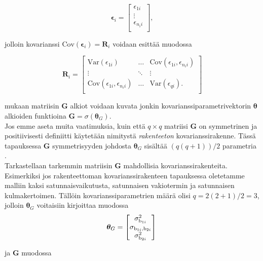 \documentclass[finnish]{docopts}
\begin{document}
$$
\bm{\epsilon}_i =
\begin{bmatrix}
\epsilon_{1i} \\
\vdots \\
\epsilon_{n_{i}i} \\
\end{bmatrix},
$$

jolloin kovarianssi  $\text{Cov}(\bm{\epsilon}_i) = \bm{R}_i$ voidaan esittää muodossa

$$
\bm{R}_i =
\begin{bmatrix}
\text{Var}(\epsilon_{1i}) & \dots & \text{Cov}(\epsilon_{1i}, \epsilon_{n_{i}i}) \\
\vdots & \ddots & \vdots \\
\text{Cov}(\epsilon_{1i}, \epsilon_{n_{i}i}) & \dots & \text{Var}(\epsilon_{qi}). \\
\end{bmatrix}
$$

\cite{burzykowski13, west14} mukaan matriisin $\bm{G}$ alkiot voidaan kuvata jonkin kovarianssiparametrivektorin $\bm{\theta}$ alkioiden funktioina $\bm{G} = \sigma(\bm{\theta}_G)$.\\

Jos emme aseta muita vaatimuksia, kuin että $q \times q$ matriisi $\bm{G}$ on symmetrinen ja positiivisesti definiitti käytetään nimitystä \textit{rakenteeton} kovarianssirakenne. Tässä tapauksessa $\bm{G}$ symmetrisyyden johdosta $\bm{\theta}_G$ sisältää $(q(q + 1))/2$ parametria \cite{burzykowski13, west14}.\\


Tarkastellaan tarkemmin matriisin $\bm{G}$ mahdollisia kovarianssirakenteita. Esimerkiksi jos rakenteettoman kovarianssirakenteen tapauksessa oletetamme malliin kaksi satunnaisvaikutusta, satunnaisen vakiotermin ja satunnaisen kulmakertoimen. Tällöin kovarianssiparametrien määrä olisi $q=2(2+1)/2=3$, jolloin $\bm{\theta}_G$ voitaisiin kirjoittaa muodossa\\

$$
\bm{\theta}_G =
\begin{bmatrix}
\sigma^2_{\text{b}_{1i}}\\
\sigma_{\text{b}_{1i}, \text{b}_{2i}} \\
\sigma^2_{\text{b}_{2i}} \\
\end{bmatrix}\\
$$

ja $\bm{G}$ muodossa \\
\end{document}
